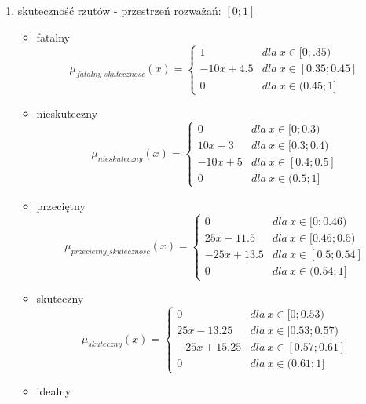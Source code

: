 \documentclass{classrep}
\begin{document}
\begin{enumerate}
    \item skuteczność rzutów - przestrzeń rozważań: $[0;1]$
     \begin{itemize}
        \item fatalny
        \begin{equation}
            \mu_{fatalny\_skutecznosc}(x) = \left\{\begin{matrix} 1 & dla \: x\in[0;.35) \\ -10x + 4.5 & dla \: x\in [0.35; 0.45] \\ 0 & dla \: x\in (0.45;1] \end{matrix}\right.
        \end{equation}
        \item nieskuteczny
        \begin{equation}
            \mu_{nieskuteczny}(x) = \left\{\begin{matrix}0 & dla \: x\in [0;0.3) \\ 10x - 3 & dla \: x\in[0.3;0.4) \\ -10x + 5 & dla \: x\in [0.4; 0.5]\\ 0 & dla \: x\in (0.5;1] \end{matrix}\right.
        \end{equation}
        \item przeciętny
        \begin{equation}
            \mu_{przecietny\_skutecznosc}(x) = \left\{\begin{matrix}0 & dla \: x\in [0;0.46) \\ 25x - 11.5 & dla \: x\in[0.46;0.5) \\ -25x + 13.5 & dla \: x\in [0.5; 0.54]\\ 0 & dla \: x\in (0.54;1] \end{matrix}\right.
        \end{equation}
        \item skuteczny
        \begin{equation}
            \mu_{skuteczny}(x) = \left\{\begin{matrix} 0 & dla \: x\in [0;0.53) \\ 25x - 13.25 & dla \: x\in[0.53;0.57) \\ -25x + 15.25 & dla \: x\in [0.57; 0.61] \\ 0 & dla \: x\in (0.61;1]\end{matrix}\right.
        \end{equation}
        \item idealny
        \begin{equation}

\end{equation}
\end{itemize}
\end{enumerate}
\end{document}
